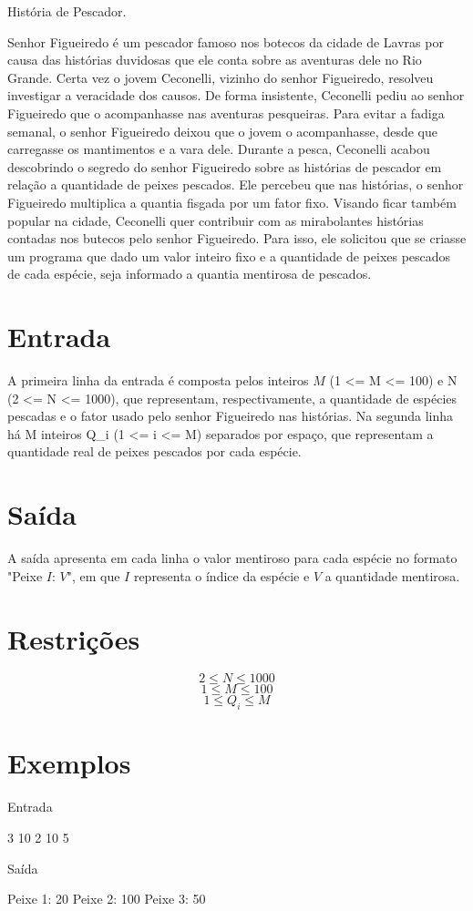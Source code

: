 História de Pescador.

Senhor Figueiredo é um pescador famoso nos botecos da cidade de Lavras por causa das histórias duvidosas que ele conta sobre as aventuras dele no Rio Grande. Certa vez o jovem Ceconelli, vizinho do senhor Figueiredo, resolveu investigar a veracidade dos causos. De forma insistente, Ceconelli pediu ao senhor Figueiredo que o acompanhasse nas aventuras pesqueiras. Para evitar a fadiga semanal, o senhor Figueiredo deixou que o jovem o acompanhasse, desde que carregasse os mantimentos e a vara dele. Durante a pesca, Ceconelli acabou descobrindo o segredo do senhor Figueiredo sobre as histórias de pescador em relação a quantidade de peixes pescados. Ele percebeu que nas histórias, o senhor Figueiredo multiplica a quantia fisgada por um fator fixo. Visando ficar também popular na cidade, Ceconelli quer contribuir com as mirabolantes histórias contadas nos butecos pelo senhor Figueiredo. Para isso, ele solicitou que se criasse um programa que dado um valor inteiro fixo e a quantidade de peixes pescados de cada espécie, seja informado a quantia mentirosa de pescados.

\section*{Entrada}

A primeira linha da entrada é composta pelos inteiros $M$ (1 <= M <= 100) e N (2 <= N <= 1000), que representam, respectivamente, a quantidade de espécies pescadas e o fator usado pelo senhor Figueiredo nas histórias. Na segunda linha há M inteiros Q_i (1 <= i <=  M) separados por espaço, que representam a quantidade real de peixes pescados por cada espécie.

\section*{Saída}

A saída apresenta em cada linha o valor mentiroso para cada espécie no formato "Peixe $I$: $V$", em que $I$ representa o índice da espécie e $V$ a quantidade mentirosa.

\section*{Restrições}

$$2 \leq N \leq 1000$$
$$1 \leq M \leq 100$$
$$1 \leq Q_i \leq M$$


\section*{Exemplos}

Entrada

3 10
2 10 5

Saída

Peixe 1: 20
Peixe 2: 100
Peixe 3: 50

\exemplo
